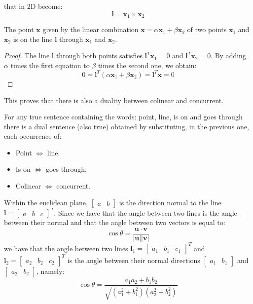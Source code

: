 \documentclass[12pt, a4paper]{report}
\newtheorem[style=M,bodystyle=\normalfont]{theorem}{Theorem}
\newtheorem[style=M,bodystyle=\normalfont]{corollary}{Corollary}
\newtheorem[style=M,bodystyle=\normalfont]{lemma}{Lemma}
\newtheorem[style=M,bodystyle=\normalfont]{definition}{Definition}
\begin{document}
    that in 2D become: 
    \[\boldsymbol{l}=\boldsymbol{x}_1 \times \boldsymbol {x}_2\] 
    \begin{example}[Property]
        The point $\boldsymbol{x}$ given by the linear combination $\boldsymbol{x}=\alpha\boldsymbol{x}_1+\beta\boldsymbol{x}_2$ of two points $\boldsymbol{x}_1$ and $\boldsymbol{x}_2$ is on the 
        line $\boldsymbol{l}$ through $\boldsymbol{x}_1$ and $\boldsymbol{x}_2$. 
    \end{example}
    \begin{proof}
        The line $\boldsymbol{l}$ through both points satisfies $\boldsymbol{l}^T\boldsymbol{x}_1=0$ and  $\boldsymbol{l}^T\boldsymbol{x}_2=0$. By adding $\alpha$ times the first 
        equation to $\beta$ times the second one, we obtain: 
        \[0=\boldsymbol{l}^T\left( \alpha\boldsymbol{x}_1+\beta\boldsymbol{x}_2 \right)=\boldsymbol{l}^T\boldsymbol{x}=0\]
    \end{proof}
    This proves that there is also a duality between colinear and concurrent. 
    \begin{theorem}
        For any true sentence containing the words: point, line, is on and goes through there is a dual sentence (also true) obtained by substituting, in the previous one, each 
        occurrence of: 
        \begin{itemize}
            \item Point $\Leftrightarrow$ line. 
            \item Is on $\Leftrightarrow$ goes through.
            \item Colinear $\Leftrightarrow$ concurrent. 
        \end{itemize}
    \end{theorem}
    Within the euclidean plane, $\begin{bmatrix} a & b \end{bmatrix}$ is the direction normal to the line $\boldsymbol{l}={\begin{bmatrix} a & b & c \end{bmatrix}}^T$. Since we have that
    the angle between two lines is the angle between their normal and that the angle between two vectors is equal to:
    \[\cos\theta=\dfrac{\boldsymbol{u} \cdot \boldsymbol{v}}{\left\lvert \boldsymbol{u} \right\rvert \left\lvert \boldsymbol{v} \right\rvert}\] 
    we have that the angle between two lines $\boldsymbol{l}_1={\begin{bmatrix} a_1 & b_1 & c_1 \end{bmatrix}}^T$ and $\boldsymbol{l}_2={\begin{bmatrix} a_2 & b_2 & c_2 \end{bmatrix}}^T$ 
    is the angle between their normal directions $\begin{bmatrix} a_1 & b_1 \end{bmatrix}$ and $\begin{bmatrix} a_2 & b_2 \end{bmatrix}$, namely: 
    \[\cos\theta=\dfrac{a_1a_2+b_1b_2}{\sqrt{\left( a_1^2 + b_1^2 \right)\left( a_2^2 + b_2^2 \right)}}\]
    
\end{document}

